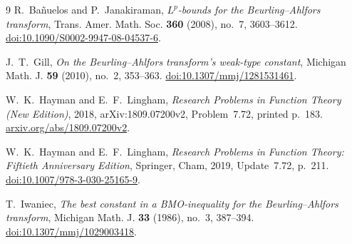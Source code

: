 \documentclass[10pt]{article}
\begin{document}
\begin{thebibliography}{9}
R.~Ba\~nuelos and P.~Janakiraman,
\emph{$L^p$-bounds for the Beurling--Ahlfors transform},
Trans. Amer. Math. Soc. \textbf{360} (2008), no.~7, 3603--3612.
\href{https://doi.org/10.1090/S0002-9947-08-04537-6}{doi:10.1090/S0002-9947-08-04537-6}.

J.~T.~Gill,
\emph{On the Beurling--Ahlfors transform's weak-type constant},
Michigan Math. J. \textbf{59} (2010), no.~2, 353--363.
\href{https://doi.org/10.1307/mmj/1281531461}{doi:10.1307/mmj/1281531461}.

W.~K.~Hayman and E.~F.~Lingham,
\emph{Research Problems in Function Theory (New Edition)},
2018, arXiv:1809.07200v2, Problem~7.72, printed p.~183.
\href{https://arxiv.org/abs/1809.07200v2}{arxiv.org/abs/1809.07200v2}.

W.~K.~Hayman and E.~F.~Lingham,
\emph{Research Problems in Function Theory: Fiftieth Anniversary Edition},
Springer, Cham, 2019, Update~7.72, p.~211.
\href{https://doi.org/10.1007/978-3-030-25165-9}{doi:10.1007/978-3-030-25165-9}.

T.~Iwaniec,
\emph{The best constant in a BMO-inequality for the Beurling--Ahlfors transform},
Michigan Math. J. \textbf{33} (1986), no.~3, 387--394.
\href{https://doi.org/10.1307/mmj/1029003418}{doi:10.1307/mmj/1029003418}.
\end{thebibliography}
\end{document}
